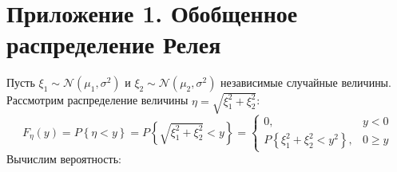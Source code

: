 \documentclass[a4paper,12pt]{article}
\newcommand{\probability}[1]{P \left \{ #1 \right \}}
\begin{document}
    \section{Приложение 1. Обобщенное распределение Релея}

    Пусть $\xi_1 \sim \mathcal{N} \left ( \mu_1, \sigma^2 \right )$ и $\xi_2 \sim \mathcal{N} \left ( \mu_2, \sigma^2 \right )$ независимые случайные величины.
    Рассмотрим распределение величины $\eta = \sqrt{\xi_1^2 + \xi_2^2}$:
    \[
        F_{\eta}(y)
        = \probability{\eta < y}
        = \probability{\sqrt{\xi_1^2 + \xi_2^2} < y}
        = \left \{
        \begin{array}{ll}
            0,                                     & y < 0   \\
            \probability{\xi_1^2 + \xi_2^2 < y^2}, & 0 \ge y
        \end{array}
        \right .
    \]
    Вычислим вероятность:
\end{document}
